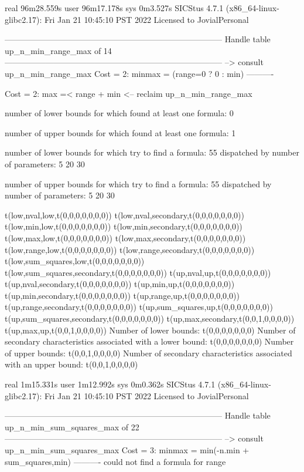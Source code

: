 real	96m28.559s
user	96m17.178s
sys	0m3.527s
SICStus 4.7.1 (x86_64-linux-glibc2.17): Fri Jan 21 10:45:10 PST 2022
Licensed to JovialPersonal


--------------------------------------------------------------------------------
Handle table up_n_min_range_max of 14
--------------------------------------------------------------------------------
--> consult up_n_min_range_max
Cost =  2:  minmax = (range=0 ? 0 : min)
----------

Cost =  2:  max =< range + min
<-- reclaim up_n_min_range_max

number of lower bounds for which found at least one formula: 0

number of upper bounds for which found at least one formula: 1

number of lower bounds for which try to find a formula: 55
dispatched by number of parameters: 5  20  30

number of upper bounds for which try to find a formula: 55
dispatched by number of parameters: 5  20  30

t(low,nval,low,t(0,0,0,0,0,0,0))
t(low,nval,secondary,t(0,0,0,0,0,0,0))
t(low,min,low,t(0,0,0,0,0,0,0))
t(low,min,secondary,t(0,0,0,0,0,0,0))
t(low,max,low,t(0,0,0,0,0,0,0))
t(low,max,secondary,t(0,0,0,0,0,0,0))
t(low,range,low,t(0,0,0,0,0,0,0))
t(low,range,secondary,t(0,0,0,0,0,0,0))
t(low,sum_squares,low,t(0,0,0,0,0,0,0))
t(low,sum_squares,secondary,t(0,0,0,0,0,0,0))
t(up,nval,up,t(0,0,0,0,0,0,0))
t(up,nval,secondary,t(0,0,0,0,0,0,0))
t(up,min,up,t(0,0,0,0,0,0,0))
t(up,min,secondary,t(0,0,0,0,0,0,0))
t(up,range,up,t(0,0,0,0,0,0,0))
t(up,range,secondary,t(0,0,0,0,0,0,0))
t(up,sum_squares,up,t(0,0,0,0,0,0,0))
t(up,sum_squares,secondary,t(0,0,0,0,0,0,0))
t(up,max,secondary,t(0,0,1,0,0,0,0))
t(up,max,up,t(0,0,1,0,0,0,0))
Number of lower bounds:                                             t(0,0,0,0,0,0,0)
Number of secondary characteristics associated with a lower bound:  t(0,0,0,0,0,0,0)
Number of upper bounds:                                             t(0,0,1,0,0,0,0)
Number of secondary characteristics associated with an upper bound: t(0,0,1,0,0,0,0)

real	1m15.331s
user	1m12.992s
sys	0m0.362s
SICStus 4.7.1 (x86_64-linux-glibc2.17): Fri Jan 21 10:45:10 PST 2022
Licensed to JovialPersonal


--------------------------------------------------------------------------------
Handle table up_n_min_sum_squares_max of 22
--------------------------------------------------------------------------------
--> consult up_n_min_sum_squares_max
Cost =  3:  minmax = min(-n.min + sum_squares,min)
----------
could not find a formula for range

